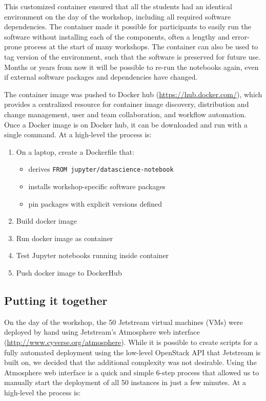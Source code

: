 This customized container ensured that all the students had an identical
environment on the day of the workshop, including all required software
dependencies. The container made it possible for participants to easily run the
software without installing each of the components, often a lengthy and
error-prone process at the start of many workshops. The container can also be
used to tag version of the environment, such that the software is preserved
for future use. Months or years from now it will be possible to re-run the
notebooks again, even if external software packages and dependencies have
changed.

The container image was pushed to Docker hub (\url{https://hub.docker.com/}),
which provides a centralized resource for container image discovery,
distribution and change management, user and team collaboration, and workflow
automation. Once a Docker image is on Docker hub, it can be downloaded and run
with a single command. At a high-level the process is:

\begin{enumerate}
  \item On a laptop, create a Dockerfile that:
  \begin{itemize}
    \item derives \texttt{FROM jupyter/datascience-notebook}
    \item installs workshop-specific software packages
    \item pin packages with explicit versions defined
  \end{itemize}
  \item Build docker image
  \item Run docker image as container
  \item Test Jupyter notebooks running inside container
  \item Push docker image to DockerHub
\end{enumerate}


\subsection{Putting it together}

On the day of the workshop, the 50 Jetstream virtual machines (VMs) were
deployed by hand using Jetstream's Atmosphere\cite{NiravCyberinfra2016} web interface
(\url{http://www.cyverse.org/atmosphere}). While it is possible to create
scripts for a fully automated deployment using the low-level OpenStack API that
Jetstream is built on, we decided that the additional complexity was not
desirable. Using the Atmosphere web interface is a quick and simple 6-step
process that allowed us to manually start the deployment of all 50 instances in
just a few minutes. At a high-level the process is:

